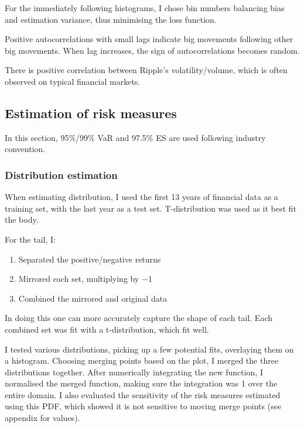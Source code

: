 \documentclass{article}
\newcommand{\ciapdf}[1]{\resizebox{\textwidth}{!}{\texttt{[image: \#1]}}}
\begin{document}
For the immediately following histograms, I chose bin numbers balancing bias
and estimation variance, thus minimising the loss function.

\ciapdf{assignment_1/report_pic/FXhist.pdf}
\ciapdf{assignment_1/report_pic/RippleHist.pdf}

Positive autocorrelations with small lags indicate big movements following
other big movements. When lag increases, the sign of autocorrelations
becomes random.

\ciapdf{assignment_1/report_pic/FXAutoCo.pdf}
\ciapdf{assignment_1/report_pic/RippleAutoCo.pdf}

There is positive correlation between Ripple's volatility/volume, which is
often observed on typical financial markets.

\ciapdf{assignment_1/report_pic/volVSvol.pdf}

\subsection*{Estimation of risk measures}

In this section, 95\%/99\% VaR and 97.5\% ES are used following industry
convention.

\subsubsection*{Distribution estimation}

When estimating distribution, I used the first 13 years of financial data as a
training set, with the last year as a test set. T-distribution was used as it
best fit the body.

\ciapdf{assignment_1/report_pic/FXBodyFit.pdf}

For the tail, I:

\begin{enumerate}
    \item Separated the positive/negative returns
    \item Mirrored each set, multiplying by $-1$
    \item Combined the mirrored and original data
\end{enumerate}

In doing this one can more accurately capture the shape of each tail. Each
combined set was fit with a t-distribution, which fit well.

\ciapdf{assignment_1/report_pic/FXTailFit.pdf}

I tested various distributions, picking up a few potential fits, overlaying
them on a histogram. Choosing merging points based on the plot, I merged the
three distributions together. After numerically integrating the new function, I
normalised the merged function, making sure the integration was 1 over the
entire domain. I also evaluated the sensitivity of the risk measures estimated
using this PDF, which showed it is not sensitive to moving merge points (see
appendix for values).
\end{document}
